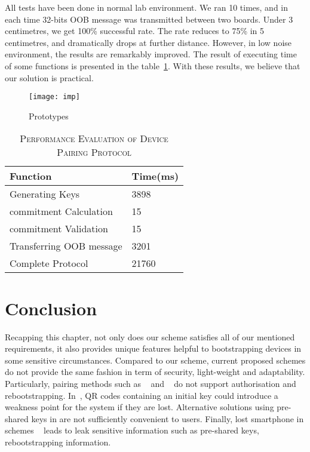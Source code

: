 All tests have been done in normal lab environment. We ran 10 times, and in each time 32-bits OOB message was transmitted between two boards. Under 3 centimetres, we get 100\% successful rate. The rate reduces to 75\% in 5 centimetres, and dramatically drops at further distance. However, in low noise environment, the results are remarkably improved. The result of executing time of some functions is presented in the table~\ref{evaluation}. With these results, we believe that our solution is practical.

\begin{figure}
  \centering
  \texttt{[image: imp]}
  \caption{Prototypes}
  \label{imp}
\end{figure}

\begin{table}[t]
\centering
\caption{\textsc{Performance Evaluation of Device Pairing Protocol}}
\label{evaluation}
{\small
\begin{tabular}{| p{5cm} | p{3cm} |}
 \hline
\textbf{Function} & \textbf{Time(ms)} \\ \hline \hline
Generating Keys & 3898 \\ \hline
commitment Calculation & 15 \\ \hline
commitment Validation & 15 \\ \hline
Transferring OOB message & 3201 \\ \hline
Complete Protocol & 21760 \\ \hline
\end{tabular}
}
\end{table}


\section{Conclusion}\label{conclusion}

Recapping this chapter, not only does our scheme satisfies all of our mentioned requirements, it also provides unique features helpful to bootstrapping devices in some sensitive circumstances. Compared to our scheme, current proposed schemes do not provide the same fashion in term of security, light-weight and adaptability. Particularly, pairing methods such as ~\cite{4159919} and ~\cite{5654588} do not support authorisation and rebootstrapping. In~\cite{Seung2015, Jeanning2013}, QR codes containing an initial key could introduce a weakness point for the system if they are lost. Alternative solutions using pre-shared keys in \cite{JCMjcm0708634642, Cha:2011:LSE:1968613.1968679, Ikram:2009:SLA:1582379.1582583, 6263790, rfc5191} are not sufficiently convenient to users. Finally, lost smartphone in schemes ~\cite{Seung2015, 6934398} leads to leak sensitive information such as pre-shared keys, rebootstrapping information.

